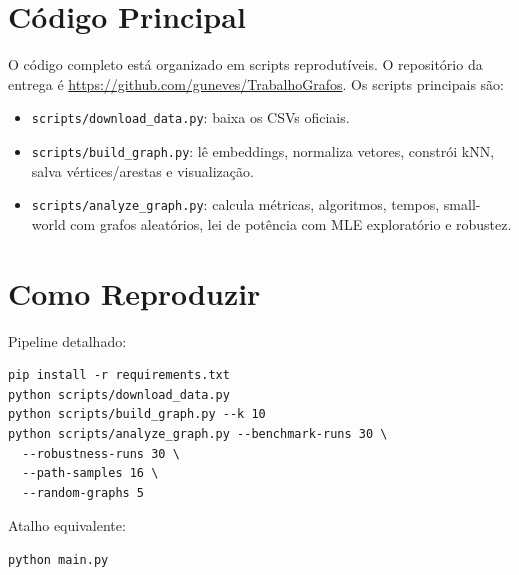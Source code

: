 \documentclass[sigconf]{webmedia}
\begin{document}
\section{Código Principal}

O código completo está organizado em scripts reprodutíveis. O repositório
da entrega é \url{https://github.com/guneves/TrabalhoGrafos}. Os scripts
principais são:

\begin{itemize}
  \item \texttt{scripts/download\_data.py}: baixa os CSVs oficiais.
  \item \texttt{scripts/build\_graph.py}: lê embeddings, normaliza vetores, constrói kNN, salva vértices/arestas e visualização.
  \item \texttt{scripts/analyze\_graph.py}: calcula métricas, algoritmos, tempos, small-world com grafos aleatórios, lei de potência com MLE exploratório e robustez.
\end{itemize}

\section{Como Reproduzir}

Pipeline detalhado:

\begin{verbatim}
pip install -r requirements.txt
python scripts/download_data.py
python scripts/build_graph.py --k 10
python scripts/analyze_graph.py --benchmark-runs 30 \
  --robustness-runs 30 \
  --path-samples 16 \
  --random-graphs 5
\end{verbatim}

Atalho equivalente:

\begin{verbatim}
python main.py
\end{verbatim}

\clearpage
\end{document}
